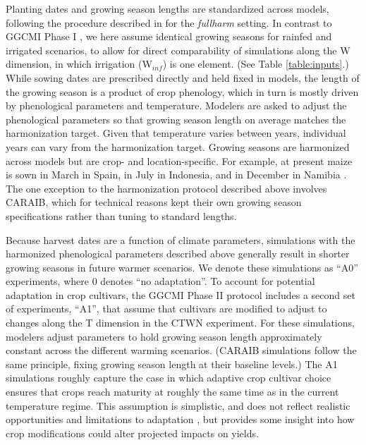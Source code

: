 \documentclass[gmd, manuscript]{copernicus} %
\begin{document}
Planting dates and growing season lengths are standardized across models, following the procedure described in \citet{Elliott2015} for the \textit{fullharm} setting. 
In contrast to GGCMI Phase I \citep{Elliott2015}, we here assume identical growing seasons for rainfed and irrigated scenarios, to allow for direct comparability of simulations along the W dimension, in which irrigation (W$_{inf}$) is one element. (See Table \ref{table:inputs}.) 
While sowing dates are prescribed directly and held fixed in models, the length of the growing season is a product of crop phenology, which in turn is mostly driven by phenological parameters and temperature. 
Modelers are asked to adjust the phenological parameters so that growing season length on average matches the harmonization target. 
Given that temperature varies between years, individual years can vary from the harmonization target.
Growing seasons are harmonized across models but are crop- and location-specific.
For example, at present maize is sown in March in Spain, in July in Indonesia, and in December in Namibia \citep{Portmann2010}.
The one exception to the harmonization protocol described above involves CARAIB, which for technical reasons kept their own growing season specifications rather than tuning to standard lengths.
 
Because harvest dates are a function of climate parameters, simulations with the harmonized phenological parameters described above generally result in shorter growing seasons in future warmer scenarios. 
We denote these simulations as ``A0'' experiments, where 0 denotes ``no adaptation''. 
To account for potential adaptation in crop cultivars, the GGCMI Phase II protocol includes a second set of experiments, ``A1'', that assume that cultivars are modified to adjust to changes along the T dimension in the CTWN experiment. 
For these simulations, modelers adjust parameters to hold growing season length approximately constant across the different warming scenarios. 
(CARAIB simulations follow the same principle, fixing growing season length at their baseline levels.) 
The A1 simulations roughly capture the case in which adaptive crop cultivar choice ensures that crops reach maturity at roughly the same time as in the current temperature regime. 
This assumption is simplistic, and does not reflect realistic opportunities and limitations to adaptation \citep{vadez2012adaptation,challinor2018improving}, but provides some insight into how crop modifications could alter projected impacts on yields.
\end{document}
